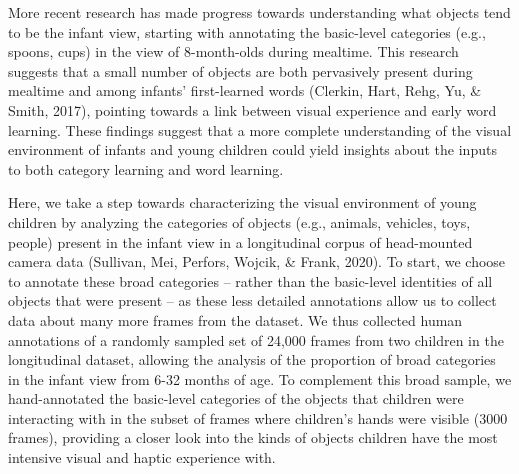 \documentclass[10pt, letterpaper]{article}
\begin{document}
More recent research has made progress towards understanding what
objects tend to be the infant view, starting with annotating the
basic-level categories (e.g., spoons, cups) in the view of 8-month-olds
during mealtime. This research suggests that a small number of objects
are both pervasively present during mealtime and among infants'
first-learned words (Clerkin, Hart, Rehg, Yu, \& Smith, 2017), pointing
towards a link between visual experience and early word learning. These
findings suggest that a more complete understanding of the visual
environment of infants and young children could yield insights about the
inputs to both category learning and word learning.

Here, we take a step towards characterizing the visual environment of
young children by analyzing the categories of objects (e.g., animals,
vehicles, toys, people) present in the infant view in a longitudinal
corpus of head-mounted camera data (Sullivan, Mei, Perfors, Wojcik, \&
Frank, 2020). To start, we choose to annotate these broad categories --
rather than the basic-level identities of all objects that were present
-- as these less detailed annotations allow us to collect data about
many more frames from the dataset. We thus collected human annotations
of a randomly sampled set of 24,000 frames from two children in the
longitudinal dataset, allowing the analysis of the proportion of broad
categories in the infant view from 6-32 months of age. To complement
this broad sample, we hand-annotated the basic-level categories of the
objects that children were interacting with in the subset of frames
where children's hands were visible (3000 frames), providing a closer
look into the kinds of objects children have the most intensive visual
and haptic experience with.
\end{document}
